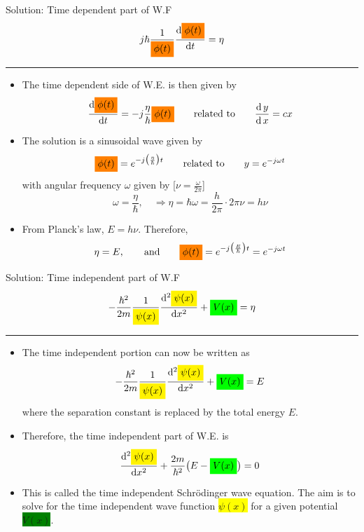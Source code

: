 %
\begin{frame}{Solution: Time dependent part of W.F}
	\[
	j \hbar \frac{1}{\colorbox{orange}{$\phi(t)$}}
	\frac{\mathrm{d} \colorbox{orange}{$\phi(t)$}}{\mathrm{d} t}
	=
	\eta
	\]
	\hrule
	\begin{itemize}
		\item The time dependent side of W.E. is then given by
		\[
		\frac{\mathrm{d} \colorbox{orange}{$\phi(t)$}}{\mathrm{d} t}
		=
		-j \frac{\eta}{\hbar}  \colorbox{orange}{$\phi(t)$}
		\qquad
		\text{related to}
		\qquad
		\frac{\mathrm{d}\, y}{\mathrm{d}\, x} = c x
		\]
		\item The solution is a sinusoidal wave given by
		\[
		\colorbox{orange}{$\phi(t)$} = e^{-j \big(\frac{\eta}{\hbar} \big) t}
				\qquad
		\text{related to}
		\qquad
		y = e^{-j \omega t}
		\]
		with angular frequency \(\omega\) given by \hfill [\(\nu = \tfrac{\omega}{2\pi}\)]
		\[
		\omega = \frac{\eta}{\hbar}, \quad \Rightarrow \eta = \hbar \omega = \frac{h}{2\pi}\cdot 2\pi \nu = h \nu
		\]
		\item From Planck's law, \(E= h \nu \). Therefore,
		\[
		\eta = E,
		\qquad
		\text{and}
		\qquad
		\colorbox{orange}{$\phi(t)$} = e^{-j \big(\frac{E}{\hbar} \big) t} = e^{-j \omega t}
		\]
	\end{itemize}
\end{frame}
%
\begin{frame}{Solution: Time independent part of W.F}
	\vspace{-1em}
	\[
-\frac{\hbar^2}{2m} \frac{1}{\colorbox{yellow}{$\psi(x)$}} \frac{\mathrm{d}^2 \colorbox{yellow}{$\psi(x)$}}{\mathrm{d} x^2}
+
\colorbox{green}{$V(x)$}
=
\eta
\]
\hrule
%
\begin{itemize}
	\item The time independent portion can now be written as
	\[
	-\frac{\hbar^2}{2m} \frac{1}{\colorbox{yellow}{$\psi(x)$}} \frac{\mathrm{d}^2 \colorbox{yellow}{$\psi(x)$}}{\mathrm{d} x^2}
	+
	\colorbox{green}{$V(x)$}
	=
	E
	\]
	where the separation constant is replaced by the total energy \(E\).
	\item Therefore, the time independent part of W.E. is
	\[
	  \frac{\mathrm{d}^2 \colorbox{yellow}{$\psi(x)$}}{\mathrm{d} x^2}
	+
	\frac{2m}{\hbar^2}\big(E - \colorbox{green}{$V(x)$}\big)
	=
	0
	\]
	\item This is called the time independent Schr\"odinger wave equation. The aim is to solve for the time independent wave function \colorbox{yellow}{$\psi(x)$} for a given potential \colorbox{green}{$V(x)$}.
\end{itemize}
\end{frame}
